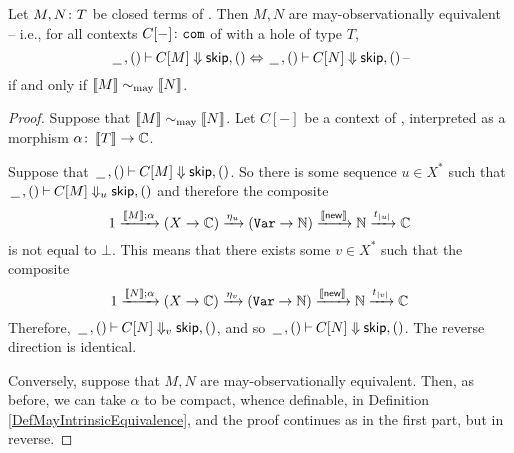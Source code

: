 \begin{theorem}
  Let $M,N\colon T$ be closed terms of \IAX. Then $M,N$ are may-observationally equivalent -- i.e., for all contexts $C[-]\colon {\mathtt{com}}$ of \IAX with a hole of type $T$, \[
    \,\underline{\hspace{1.5ex}}\,,()\mathbin{\vdash} C[M] \Downarrow {\mathsf{skip}},() \Leftrightarrow \,\underline{\hspace{1.5ex}}\,,()\mathbin{\vdash} C[N] \Downarrow {\mathsf{skip}},()\,\text{--}
    \]
  if and only if $\left\llbracket M\right\rrbracket \sim_{\operatorname{may}} \left\llbracket N\right\rrbracket$.
\end{theorem}
\begin{proof}
  Suppose that $\left\llbracket M\right\rrbracket\sim_{\operatorname{may}}\left\llbracket N\right\rrbracket$.  
  Let $C[-]$ be a context of \IAX, interpreted as a morphism $\alpha \colon \left\llbracket T\right\rrbracket \to \mathbb{C}$.

  Suppose that $\,\underline{\hspace{1.5ex}}\,,()\mathbin{\vdash} C[M] \Downarrow {\mathsf{skip}},()$.  
  So there is some sequence $u\in X^*$ such that $\,\underline{\hspace{1.5ex}}\,,()\mathbin{\vdash} C[M] \Downarrow_u {\mathsf{skip}},()$ and therefore the composite
  \[
    1 \xrightarrow{\left\llbracket M\right\rrbracket;\alpha}
    (X \to \mathbb{C}) \xrightarrow{\eta_u}
    ({\mathtt{Var}} \to \mathbb{N}) \xrightarrow{\left\llbracket\operatorname{{\mathsf{new}}}\right\rrbracket}
    \mathbb{N} \xrightarrow{t_{|u|}}
    \mathbb{C}
    \]
  is not equal to $\bot$.  
  This means that there exists some $v\in X^*$ such that the composite
  \[
    1 \xrightarrow{\left\llbracket N\right\rrbracket;\alpha}
    (X \to \mathbb{C}) \xrightarrow{\eta_v}
    ({\mathtt{Var}} \to \mathbb{N}) \xrightarrow{\left\llbracket\operatorname{{\mathsf{new}}}\right\rrbracket}
    \mathbb{N} \xrightarrow{t_{|v|}}
    \mathbb{C}
    \]
  Therefore, $\,\underline{\hspace{1.5ex}}\,,()\mathbin{\vdash} C[N] \Downarrow_v {\mathsf{skip}},()$, and so $\,\underline{\hspace{1.5ex}}\,,()\mathbin{\vdash} C[N] \Downarrow {\mathsf{skip}},()$.
  The reverse direction is identical.

  Conversely, suppose that $M,N$ are may-observationally equivalent.  
  Then, as before, we can take $\alpha$ to be compact, whence definable, in Definition \ref{DefMayIntrinsicEquivalence}, and the proof continues as in the first part, but in reverse.
\end{proof}


